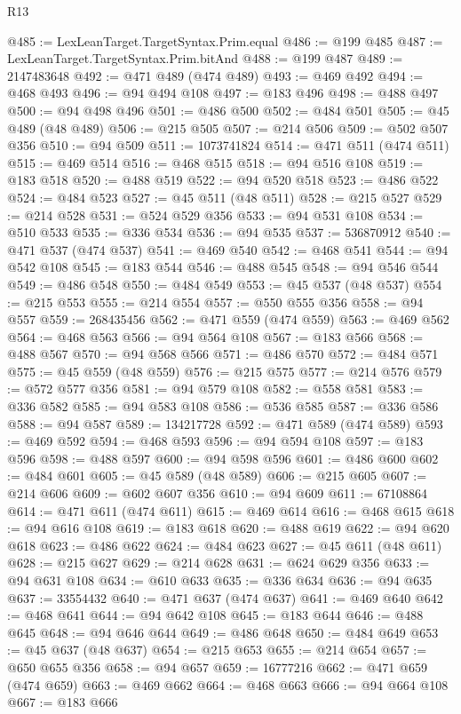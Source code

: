 \begin{lexlean}{R13}
\begin{coremodule}
@485 := LexLeanTarget.TargetSyntax.Prim.equal
@486 := @199 @485
@487 := LexLeanTarget.TargetSyntax.Prim.bitAnd
@488 := @199 @487
@489 := 2147483648
@492 := @471 @489 (@474 @489)
@493 := @469 @492
@494 := @468 @493
@496 := @94 @494 @108
@497 := @183 @496
@498 := @488 @497
@500 := @94 @498 @496
@501 := @486 @500
@502 := @484 @501
@505 := @45 @489 (@48 @489)
@506 := @215 @505
@507 := @214 @506
@509 := @502 @507 @356
@510 := @94 @509
@511 := 1073741824
@514 := @471 @511 (@474 @511)
@515 := @469 @514
@516 := @468 @515
@518 := @94 @516 @108
@519 := @183 @518
@520 := @488 @519
@522 := @94 @520 @518
@523 := @486 @522
@524 := @484 @523
@527 := @45 @511 (@48 @511)
@528 := @215 @527
@529 := @214 @528
@531 := @524 @529 @356
@533 := @94 @531 @108
@534 := @510 @533
@535 := @336 @534
@536 := @94 @535
@537 := 536870912
@540 := @471 @537 (@474 @537)
@541 := @469 @540
@542 := @468 @541
@544 := @94 @542 @108
@545 := @183 @544
@546 := @488 @545
@548 := @94 @546 @544
@549 := @486 @548
@550 := @484 @549
@553 := @45 @537 (@48 @537)
@554 := @215 @553
@555 := @214 @554
@557 := @550 @555 @356
@558 := @94 @557
@559 := 268435456
@562 := @471 @559 (@474 @559)
@563 := @469 @562
@564 := @468 @563
@566 := @94 @564 @108
@567 := @183 @566
@568 := @488 @567
@570 := @94 @568 @566
@571 := @486 @570
@572 := @484 @571
@575 := @45 @559 (@48 @559)
@576 := @215 @575
@577 := @214 @576
@579 := @572 @577 @356
@581 := @94 @579 @108
@582 := @558 @581
@583 := @336 @582
@585 := @94 @583 @108
@586 := @536 @585
@587 := @336 @586
@588 := @94 @587
@589 := 134217728
@592 := @471 @589 (@474 @589)
@593 := @469 @592
@594 := @468 @593
@596 := @94 @594 @108
@597 := @183 @596
@598 := @488 @597
@600 := @94 @598 @596
@601 := @486 @600
@602 := @484 @601
@605 := @45 @589 (@48 @589)
@606 := @215 @605
@607 := @214 @606
@609 := @602 @607 @356
@610 := @94 @609
@611 := 67108864
@614 := @471 @611 (@474 @611)
@615 := @469 @614
@616 := @468 @615
@618 := @94 @616 @108
@619 := @183 @618
@620 := @488 @619
@622 := @94 @620 @618
@623 := @486 @622
@624 := @484 @623
@627 := @45 @611 (@48 @611)
@628 := @215 @627
@629 := @214 @628
@631 := @624 @629 @356
@633 := @94 @631 @108
@634 := @610 @633
@635 := @336 @634
@636 := @94 @635
@637 := 33554432
@640 := @471 @637 (@474 @637)
@641 := @469 @640
@642 := @468 @641
@644 := @94 @642 @108
@645 := @183 @644
@646 := @488 @645
@648 := @94 @646 @644
@649 := @486 @648
@650 := @484 @649
@653 := @45 @637 (@48 @637)
@654 := @215 @653
@655 := @214 @654
@657 := @650 @655 @356
@658 := @94 @657
@659 := 16777216
@662 := @471 @659 (@474 @659)
@663 := @469 @662
@664 := @468 @663
@666 := @94 @664 @108
@667 := @183 @666

\end{coremodule}
\end{lexlean}
